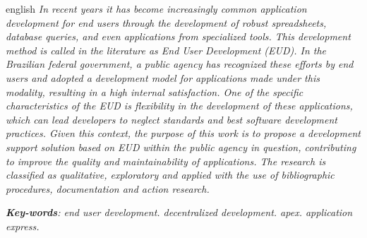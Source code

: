 \begin{resumo}[Abstract]
 \begin{otherlanguage*}{english}
   \textit{In recent years it has become increasingly common application development for end users through the development of robust spreadsheets, database queries, and even applications from specialized tools. This development method is called in the literature as End User Development (EUD). In the Brazilian federal government, a public agency has recognized these efforts by end users and adopted a development model for applications made under this modality, resulting in a high internal satisfaction. One of the specific characteristics of the EUD is flexibility in the development of these applications, which can lead developers to neglect standards and best software development practices. Given this context, the purpose of this work is to propose a development support solution based on EUD within the public agency in question, contributing to improve the quality and maintainability of applications. The research is classified as qualitative, exploratory and applied with the use of bibliographic procedures, documentation and action research.}

   \vspace{\onelineskip}
 
   \noindent 
   \textit{\textbf{Key-words}: end user development. decentralized development. apex. application express.}
 \end{otherlanguage*}
\end{resumo}